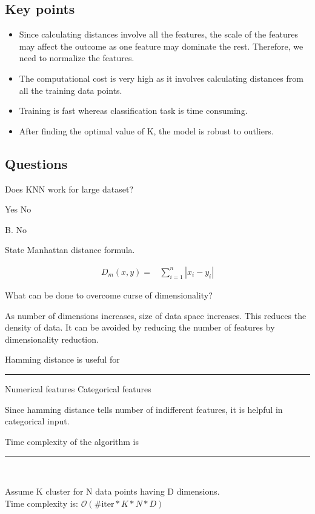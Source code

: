\documentclass[12pt,letterpaper, onecolumn]{exam}
\begin{document}
\subsection*{Key points}
\begin{itemize}
\item Since calculating distances involve all the features, the scale of the features may affect the outcome as one feature may dominate the rest. Therefore, we need to normalize the features.
\item The computational cost is very high as it involves calculating distances from all the training data points.
\item Training is fast whereas classification task is time consuming.
\item After finding the optimal value of K, the model is robust to outliers.
\end{itemize}

\subsection*{Questions}

\begin{questions}
\question[] Does KNN work for large dataset?
\begin{choices}
\choice Yes
\choice No
\end{choices}
\begin{Solution}
B. No
\end{Solution}
\question[] State Manhattan distance formula.\\
\begin{Solution}
\begin{align*}
D_m(x,y) = {}& \sum_{i=1}^n |x_i-y_i|
\end{align*}
\end{Solution}
\question[] What can be done to overcome curse of dimensionality?\\
\begin{Solution}
As number of dimensions increases, size of data space increases. This reduces the density of data. It can be avoided by reducing the number of features by dimensionality reduction.
\end{Solution}
\question[] Hamming distance is useful for \rule{2cm}{0.15mm}
\begin{choices}
\choice Numerical features
\choice Categorical features
\end{choices}
\begin{Solution}
Since hamming distance tells number of indifferent features, it is helpful in categorical input. 
\end{Solution}
\question[] Time complexity of the algorithm is \rule{2cm}{0.15mm}\\
\begin{Solution}
Assume K cluster for N data points having D dimensions.\\
Time complexity is:
$\mathcal{O}(\#\text{iter}*K*N*D)$
\end{Solution}
\end{questions}
\end{document}
